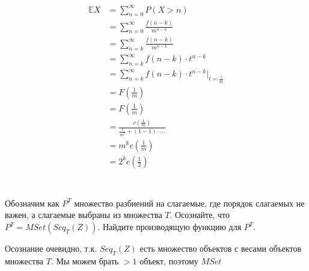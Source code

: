 \begin{align*}
    \mathbb E X & = \sum_{n=0}^\infty P(X > n)                                             \\
                & = \sum_{n=0}^\infty \frac{f(n - k)}{m^{n - k}}                           \\
                & = \sum_{n= k}^\infty \frac{f(n - k)}{m^{n - k}}                          \\
                & = \sum_{n= k}^\infty f(n - k)\cdot t^{n - k}                             \\
                & = \sum_{n= k}^\infty f(n - k)\cdot t^{n - k} \Big|_{t = \frac{1}{m}}     \\
                & = F\left( \frac{1}{m} \right)                                            \\
                & = F\left( \frac{1}{m} \right)                                            \\
                & = \frac{c\left( \frac{1}{m} \right)}{\frac{1}{m^k} + (1 - 1)\cdot \dots} \\
                & = m^k c\left( \frac{1}{m} \right)                                        \\
                & = 2^k c\left( \frac{1}{2} \right)                                        \\
\end{align*}

\section{}
Обозначим как $P^T$ множество разбиений на слагаемые, где порядок слагаемых не важен, а слагаемые выбраны из множества $T$. Осознайте, что $P^T = MSet(Seq_T(Z))$. Найдите производящую функцию для $P^T$.

Осознание очевидно, т.к. \(Seq_T(Z)\) есть множество объектов с весами объектов множества \(T\). Мы можем брать \( > 1\) объект, поэтому \(MSet\)



